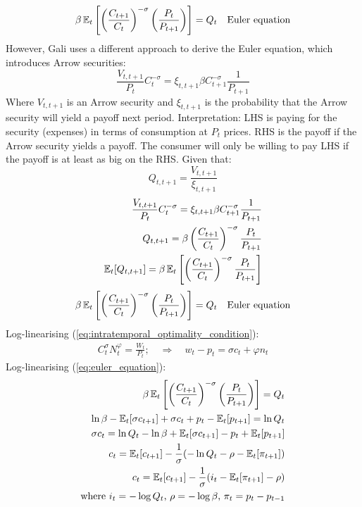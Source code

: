 \documentclass[12pt]{article}
\begin{document}
\begin{align}
    \beta\operatorname{\mathbb{E}}_t\left[\left(\frac{C_{t+1}}{C_{t}}\right)^{-\sigma} \left(\frac{P_{t}}{ P_{t+1}}\right)\right]                 = Q_t &  & \text{Euler equation}
\end{align}
However, Gali uses a different approach to derive the Euler equation, which introduces Arrow securities:
\begin{equation}
    \frac{V_{t,t+1}}{P_t}C_{t}^{-\sigma} = \xi_{t,t+1} \beta C_{t+1}^{-\sigma} \frac{1}{P_{t+1}} \label{eq:introduces_arrow_securities}
\end{equation}
Where $V_{t,t+1}$ is an Arrow security and $\xi_{t,t+1}$ is the probability that the Arrow security will yield a payoff next period. Interpretation: LHS is paying for the security (expenses) in terms of consumption at $P_t$ prices. RHS is the payoff if the Arrow security yields a payoff. The consumer will only be willing to pay LHS if the payoff is at least as big on the RHS.
Given that:
\begin{equation}
    Q_{t,t+1} = \frac{V_{t,t+1}}{\xi_{t,t+1}}
\end{equation}
\begin{align}
    \frac{V_{t,t+1}}{P_t}C_{t}^{-\sigma} = \xi_{t,t+1} \beta C_{t+1}^{-\sigma} \frac{1}{P_{t+1}} \\
    Q_{t,t+1} = \beta \left(\frac{C_{t+1}}{C_{t}}\right)^{-\sigma} \frac{P_t}{P_{t+1}}           \\
    \operatorname{\mathbb{E}}_t [Q_{t,t+1}] = \beta \operatorname{\mathbb{E}}_t\left[\left(\frac{C_{t+1}}{C_{t}}\right)^{-\sigma} \frac{P_t}{P_{t+1}}\right]
\end{align}
\begin{align}
    \beta\operatorname{\mathbb{E}}_t\left[\left(\frac{C_{t+1}}{C_{t}}\right)^{-\sigma} \left(\frac{P_{t}}{ P_{t+1}}\right)\right] \label{eq:euler_equation}                = Q_t &  & \text{Euler equation}
\end{align}
Log-linearising (\ref{eq:intratemporal_optimality_condition}):
\begin{align}
    C_t^{\sigma} N_t^{\varphi} =  \frac{W_t}{P_t}; \quad \Rightarrow \quad w_t - p_t = \sigma c_t + \varphi n_t
\end{align}
Log-linearising (\ref{eq:euler_equation}):
\begin{align}
    \beta\operatorname{\mathbb{E}}_t\left[\left(\frac{C_{t+1}}{C_{t}}\right)^{-\sigma} \left(\frac{P_{t}}{ P_{t+1}}\right)\right]                = Q_t \nonumber \\
    \ln\beta - \operatorname{\mathbb{E}}_t[\sigma c_{t+1}] + \sigma c_t + p_t - \operatorname{\mathbb{E}}_t [p_{t+1}] = \ln Q_t                                              \nonumber  \\
    \sigma c_t  = \ln Q_t - \ln \beta + \operatorname{\mathbb{E}}_t[\sigma c_{t+1}] - p_t + \operatorname{\mathbb{E}}_t [p_{t+1}]                                             \nonumber \\
    c_t =  \operatorname{\mathbb{E}}_t[c_{t+1}] - \frac{1}{\sigma}( -\ln Q_t - \rho - \operatorname{\mathbb{E}}_t [\pi_{t+1}]   )                                             \nonumber \\
    c_t =  \operatorname{\mathbb{E}}_t[c_{t+1}] - \frac{1}{\sigma}( i_t  - \operatorname{\mathbb{E}}_t [\pi_{t+1}] - \rho  )                                                            \\
    \text{where $i_t = -\log Q_t$, $\rho = -\log \beta$, $\pi_t = p_t - p_{t-1}$} \nonumber
\end{align}
\end{document}
